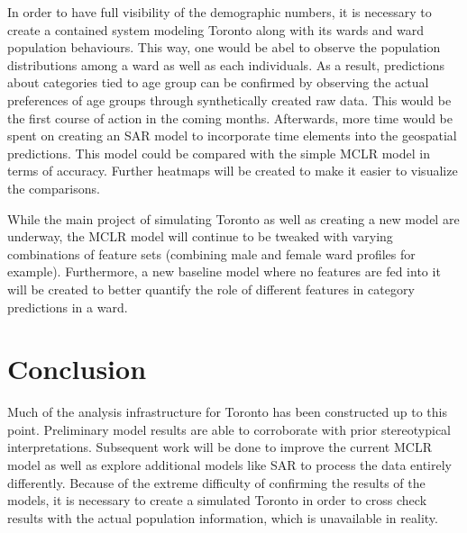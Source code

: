 \documentclass[12pt]{article}
\begin{document}
   In order to have full visibility of the demographic numbers, it is necessary to create a contained system modeling Toronto along with its wards and ward population behaviours. This way, one would be abel to observe the population distributions among a ward as well as each individuals. As a result, predictions about categories tied to age group can be confirmed by observing the actual preferences of age groups through synthetically created raw data. This would be the first course of action in the coming months. Afterwards, more time would be spent on creating an SAR model to incorporate time elements into the geospatial predictions. This model could be compared with the simple MCLR model in terms of accuracy. Further heatmaps will be created to make it easier to visualize the comparisons. 

   While the main project of simulating Toronto as well as creating a new model are underway, the MCLR model will continue to be tweaked with varying combinations of feature sets (combining male and female ward profiles for example). Furthermore, a new baseline model where no features are fed into it will be created to better quantify the role of different features in category predictions in a ward. 

   \section{Conclusion}

   Much of the analysis infrastructure for Toronto has been constructed up to this point. Preliminary model results are able to corroborate with prior stereotypical interpretations. Subsequent work will be done to improve the current MCLR model as well as explore additional models like SAR to process the data entirely differently. Because of the extreme difficulty of confirming the results of the models, it is necessary to create a simulated Toronto in order to cross check results with the actual population information, which is unavailable in reality. 


\newpage
\printbibliography
\end{document}
